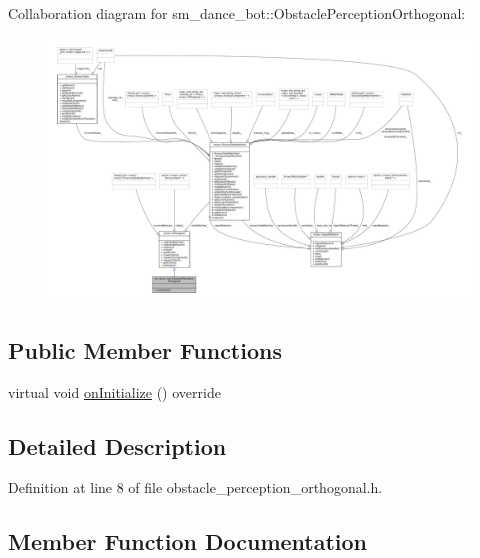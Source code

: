 Collaboration diagram for sm\+\_\+dance\+\_\+bot\+:\+:Obstacle\+Perception\+Orthogonal\+:
\nopagebreak
\begin{figure}[H]
\begin{center}
\leavevmode
\includegraphics[width=350pt]{classsm__dance__bot_1_1ObstaclePerceptionOrthogonal__coll__graph}
\end{center}
\end{figure}
\subsection*{Public Member Functions}
\begin{DoxyCompactItemize}
\item 
virtual void \hyperlink{classsm__dance__bot_1_1ObstaclePerceptionOrthogonal_a45afedc40daa31ef7d0ab65709cfacaf}{on\+Initialize} () override
\end{DoxyCompactItemize}


\subsection{Detailed Description}


Definition at line 8 of file obstacle\+\_\+perception\+\_\+orthogonal.\+h.



\subsection{Member Function Documentation}
